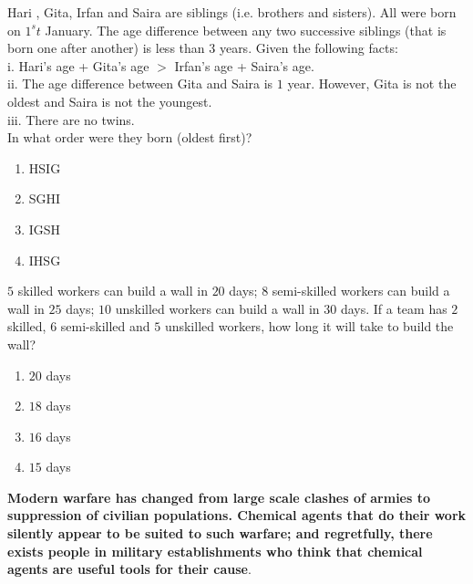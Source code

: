     \item Hari , Gita, Irfan and Saira are siblings (i.e. brothers and sisters). All were born on $1^st$ January. The age difference between any two successive siblings (that is born one after another) is less than $3$ years. Given the following facts:\\
    i. Hari's age + Gita's age $>$ Irfan's age + Saira's age.\\
    ii. The age difference between Gita and Saira is $1$ year. However, Gita is not the oldest and Saira is not the youngest.\\
    iii. There are no twins.\\
    In what order were they born (oldest first)?
    \begin{enumerate}
        \item HSIG
        \item SGHI
        \item IGSH
        \item IHSG
    \end{enumerate}
    \item $5$ skilled workers can build a wall in $20$ days; $8$ semi-skilled workers can build a wall in $25$ days; $10$ unskilled workers can build a wall in $30$ days. If a team has $2$ skilled, $6$ semi-skilled and $5$ unskilled workers, how long it will take to build the wall? 
    \begin{enumerate}
        \item $20$ days
        \item $18$ days
        \item $16$ days
        \item $15$ days
    \end{enumerate}
    \item \textbf{Modern warfare has changed from large scale clashes of armies to suppression of civilian populations. Chemical agents that do their work silently appear to be suited to such warfare; and regretfully, there exists people in military establishments who think that chemical agents are useful tools for their cause}.\\
    
